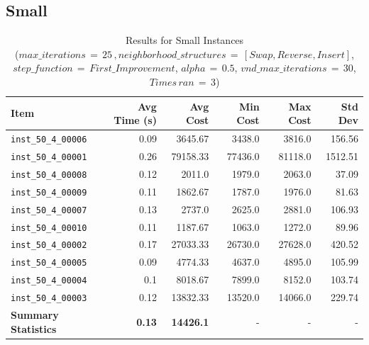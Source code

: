 \documentclass{article}
\begin{document}
\subsection*{Small}
\begin{table}[H]
	\centering
  \caption{Results for Small Instances \\($max\_iterations \,{=}\, 25\,, neighborhood\_structures \,{=}\, [Swap, Reverse, Insert]$, $step\_function \,{=}\, First\_Improvement$, $alpha \,{=}\, 0.5$, $vnd\_max\_iterations \,{=}\, 30$, $Times\, ran \,{=}\, 3$)}
    \hspace*{-2cm}
	\begin{tabular}{lrrrrr}
		\toprule
		\textbf{Item} & \textbf{Avg Time (s)} & \textbf{Avg Cost} & \textbf{Min Cost} & \textbf{Max Cost} & \textbf{Std Dev} \\
		\midrule
		\texttt{inst\_50\_4\_00006} & 0.09 & 3645.67 & 3438.0 & 3816.0 & 156.56 \\ 
		\texttt{inst\_50\_4\_00001} & 0.26 & 79158.33 & 77436.0 & 81118.0 & 1512.51 \\ 
		\texttt{inst\_50\_4\_00008} & 0.12 & 2011.0 & 1979.0 & 2063.0 & 37.09 \\ 
		\texttt{inst\_50\_4\_00009} & 0.11 & 1862.67 & 1787.0 & 1976.0 & 81.63 \\ 
		\texttt{inst\_50\_4\_00007} & 0.13 & 2737.0 & 2625.0 & 2881.0 & 106.93 \\ 
		\texttt{inst\_50\_4\_00010} & 0.11 & 1187.67 & 1063.0 & 1272.0 & 89.96 \\ 
		\texttt{inst\_50\_4\_00002} & 0.17 & 27033.33 & 26730.0 & 27628.0 & 420.52 \\ 
		\texttt{inst\_50\_4\_00005} & 0.09 & 4774.33 & 4637.0 & 4895.0 & 105.99 \\ 
		\texttt{inst\_50\_4\_00004} & 0.1 & 8018.67 & 7899.0 & 8152.0 & 103.74 \\ 
		\texttt{inst\_50\_4\_00003} & 0.12 & 13832.33 & 13520.0 & 14066.0 & 229.74 \\ \midrule \textbf{Summary Statistics} & \textbf{0.13} & \textbf{14426.1} & - & - & - \\
		\bottomrule
	\end{tabular}
	\label{tab:performance_metrics_small_grasp}
\end{table}
\end{document}
